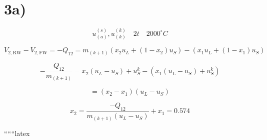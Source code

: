 

\section*{3a)}

\[
u_{(a)}^{(s)}, u_{(k)}^{(k)} \quad 2t \quad 2000^\circ C
\]

\[
V_{2, \text{RW}} - V_{2, \text{FW}} = -Q_{12} = m_{(k+1)} \left( x_2 u_L + (1 - x_2) u_S \right) - \left( x_1 u_L + (1 - x_1) u_S \right)
\]

\[
-\frac{Q_{12}}{m_{(k+1)}} = x_2 (u_L - u_S) + u_S^k - (x_1 (u_L - u_S) + u_S^k)
\]

\[
= (x_2 - x_1) (u_L - u_S)
\]

\[
x_2 = \frac{-Q_{12}}{m_{(k+1)} (u_L - u_S)} + x_1 = 0.574
\]

``````latex